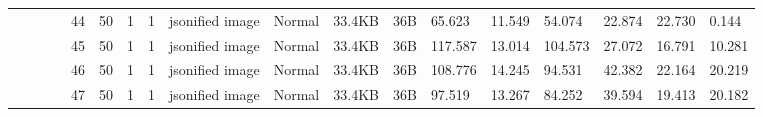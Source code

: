 \begin{landscape}
\begin{table}[]
{\begin{tabular}{@{}ccccllllllllllllll@{}}
                                                                                   &                              &                                &                                                                                                          & 44                                                    & 50                                       & 1                                          & 1                                 & jsonified image                  & Normal                             & 33.4KB                                        & 36B                                             & 65.623                  & 11.549   & 54.074                       & 22.874                  & 22.730   & 0.144                        \\
                                                                                   &                              &                                &                                                                                                          & 45                                                    & 50                                       & 1                                          & 1                                 & jsonified image                  & Normal                             & 33.4KB                                        & 36B                                             & 117.587                 & 13.014   & 104.573                      & 27.072                  & 16.791   & 10.281                       \\
                                                                                   &                              &                                &                                                                                                          & 46                                                    & 50                                       & 1                                          & 1                                 & jsonified image                  & Normal                             & 33.4KB                                        & 36B                                             & 108.776                 & 14.245   & 94.531                       & 42.382                  & 22.164   & 20.219                       \\
                                                                                   &                              &                                &                                                                                                          & 47                                                    & 50                                       & 1                                          & 1                                 & jsonified image                  & Normal                             & 33.4KB                                        & 36B                                             & 97.519                  & 13.267   & 84.252                       & 39.594                  & 19.413   & 20.182                       \\

\end{tabular}}
\end{table}
\end{landscape}
